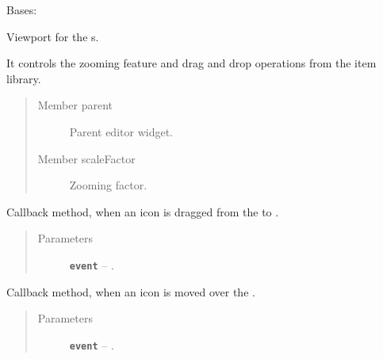 \documentclass[a4paper,10pt,english]{sphinxmanual}
\begin{document}

\begin{fulllineitems}
\label{gui_link:gui.DiagramEditor.EditorGraphicsView}
Bases: 

Viewport for the  s.

It controls the zooming feature and drag and drop operations from the item library.
\begin{quote}\begin{description}
\item[{Member parent}] \leavevmode
Parent editor widget.

\item[{Member scaleFactor}] \leavevmode
Zooming factor.

\end{description}\end{quote}

\begin{fulllineitems}
\label{gui_link:gui.DiagramEditor.EditorGraphicsView.dragEnterEvent}
Callback method, when an icon is dragged from the  to .
\begin{quote}\begin{description}
\item[{Parameters}] \leavevmode
\textbf{\texttt{event}} -- .

\end{description}\end{quote}

\end{fulllineitems}


\begin{fulllineitems}
\label{gui_link:gui.DiagramEditor.EditorGraphicsView.dragMoveEvent}
Callback method, when an icon is moved over the .
\begin{quote}\begin{description}
\item[{Parameters}] \leavevmode
\textbf{\texttt{event}} -- .


\end{description}
\end{quote}
\end{fulllineitems}
\end{fulllineitems}
\end{document}
